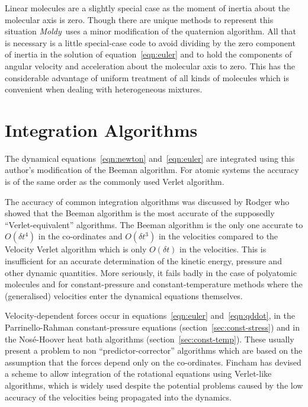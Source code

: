 \documentclass[twoside]{report}
\newcommand{\moldy}{{\em Moldy}}
\begin{document}
Linear molecules are a slightly special case as the moment of inertia
about the molecular axis is zero.  Though there are unique methods to
represent this situation\cite[page 90]{allen:87} \moldy\ uses a minor
modification of the quaternion algorithm.  All that is necessary is a
little special-case code to avoid dividing by the zero component of
inertia in the solution of equation~\ref{eqn:euler} and to hold the
components of angular velocity and acceleration about the molecular
axis to zero.  This has the considerable advantage of uniform
treatment of all kinds of molecules which is convenient when dealing
with heterogeneous mixtures.

\section{Integration Algorithms}   %

The dynamical equations~\ref{eqn:newton} and~\ref{eqn:euler} are
integrated using this author's modification\cite{refson:85} of the
Beeman algorithm\cite{beeman:76}.  For atomic systems the accuracy is
of the same order as the commonly used Verlet
algorithm\cite{verlet:67}.  

The accuracy of common integration algorithms was discussed by
Rodger\cite{rodger:89} who showed that the Beeman algorithm is the
most accurate of the supposedly ``Verlet-equivalent'' algorithms. The
Beeman algorithm is the only one accurate to $O(\delta t^4)$ in the
co-ordinates and $O(\delta t^3)$ in the velocities compared to the
Velocity Verlet algorithm which is only $O(\delta t)$ in the
velocities. This is insufficient for an accurate determination of the
kinetic energy, pressure and other dynamic quantities. More seriously,
it fails badly in the case of polyatomic molecules and for
constant-pressure and constant-temperature methods where the
(generalised) velocities enter the dynamical equations themselves.

Velocity-dependent forces occur in equations~\ref{eqn:euler}
and~\ref{eqn:qddot}, in the Parrinello-Rahman constant-pressure
equations (section~\ref{sec:const-stress}) and in the Nos\'e-Hoover
heat bath algorithms (section~\ref{sec:const-temp}). These usually
present a problem to non ``predictor-corrector'' algorithms which are
based on the assumption that the forces depend only on the
co-ordinates.  Fincham has devised a scheme to allow integration of
the rotational equations using Verlet-like
algorithms\cite{fincham:81}, which is widely used despite the
potential problems caused by the low accuracy of the velocities being
propagated into the dynamics.
\end{document}
